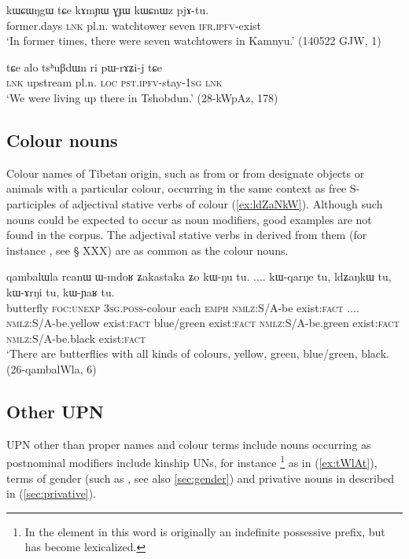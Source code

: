 \begin{exe}
\ex \label{ex:kAmYW.GJW}
 \gll  kɯɕɯŋgɯ tɕe kɤmɲɯ ɣɟɯ kɯɕnɯz pjɤ-tu. \\
 former.days \textsc{lnk} pl.n. watchtower  seven \textsc{ifr}.\textsc{ipfv}-exist \\
 \glt `In former times, there were seven watchtowers in Kamnyu.' (140522 GJW, 1)
\end{exe}

\begin{exe}
\ex \label{ex:tshuBdWn.ri}
 \gll  tɕe alo tsʰuβdɯn ri pɯ-rɤʑi-j tɕe \\
 \textsc{lnk} upstream pl.n. \textsc{loc} \textsc{pst}.\textsc{ipfv}-stay-\textsc{1sg} \textsc{lnk} \\
 \glt `We were living up there in Tshobdun.' (28-kWpAz, 178)
\end{exe}

\subsection{Colour nouns} \label{sec:tibetan.colours}
Colour names of Tibetan origin, such as  from  or  from  designate objects or animals with a particular colour, occurring in the same context as free S-participles of adjectival stative verbs of colour (\ref{ex:ldZaNkW}). Although such nouns could be expected to occur as noun modifiers, good examples are not found in the corpus. The adjectival stative verbs in  derived from them (for instance , see § XXX) are as common as the colour nouns.
 
\begin{exe}
\ex \label{ex:ldZaNkW}
 \gll qambalɯla rcanɯ ɯ-mdoʁ ʑakastaka ʑo kɯ-ŋu tu. .... kɯ-qarŋe tu, ldʑaŋkɯ tu, kɯ-ɤrŋi tu, kɯ-ɲaʁ tu. \\
 butterfly \textsc{foc}:\textsc{unexp} \textsc{3sg}.\textsc{poss}-colour each \textsc{emph} \textsc{nmlz}:S/A-be exist:\textsc{fact} .... \textsc{nmlz}:S/A-be.yellow exist:\textsc{fact} blue/green exist:\textsc{fact}  \textsc{nmlz}:S/A-be.green exist:\textsc{fact} \textsc{nmlz}:S/A-be.black exist:\textsc{fact}\\
 \glt `There are butterflies with all kinds of colours, yellow, green, blue/green, black. (26-qambalWla, 6)
\end{exe}

\subsection{Other UPN}   \label{sec:other.upn}
UPN other than proper names and colour terms include nouns occurring as postnominal modifiers include kinship UNs, for instance \footnote{In  the  element in this word is originally an indefinite possessive prefix, but has become lexicalized.} as in (\ref{ex:tWlAt}), terms of gender (such as , see also \ref{sec:gender}) and  privative nouns in  described in (\ref{sec:privative}). 

